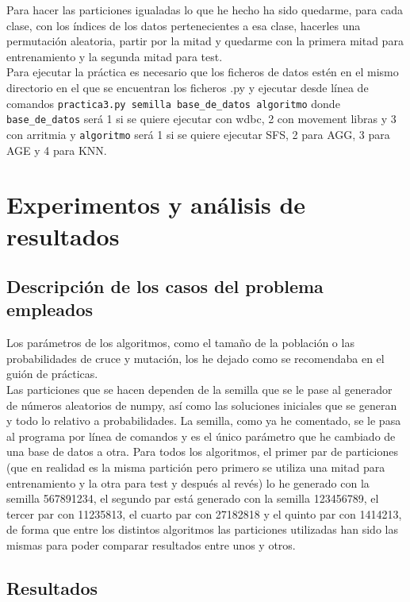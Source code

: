\documentclass[12pt]{article}
\begin{document}
Para hacer las particiones igualadas lo que he hecho ha sido quedarme, para cada clase, con los índices de los datos pertenecientes a esa clase, hacerles una permutación aleatoria, partir por la mitad y quedarme con la primera mitad para entrenamiento y la segunda mitad para test.\\

Para ejecutar la práctica es necesario que los ficheros de datos estén en el mismo directorio en el que se encuentran los ficheros .py y ejecutar desde línea de comandos \texttt{practica3.py semilla base\_de\_datos algoritmo} donde \texttt{base\_de\_datos} será 1 si se quiere ejecutar con wdbc, 2 con movement libras y 3 con arritmia y \texttt{algoritmo} será 1 si se quiere ejecutar SFS, 2 para AGG, 3 para AGE y 4 para KNN.

\newpage

\section{Experimentos y análisis de resultados}
\subsection{Descripción de los casos del problema empleados}

Los parámetros de los algoritmos, como el tamaño de la población o las probabilidades de cruce y mutación, los he dejado como se recomendaba en el guión de prácticas.\\
Las particiones que se hacen dependen de la semilla que se le pase al generador de números aleatorios de numpy, así como las soluciones iniciales que se generan y todo lo relativo a probabilidades. La semilla, como ya he comentado, se le pasa al programa por línea de comandos y es el único parámetro que he cambiado de una base de datos a otra. Para todos los algoritmos, el primer par de particiones (que en realidad es la misma partición pero primero se utiliza una mitad para entrenamiento y la otra para test y después al revés) lo he generado con la semilla 567891234, el segundo par está generado con la semilla 123456789, el tercer par con 11235813, el cuarto par con 27182818 y el quinto par con 1414213, de forma que entre los distintos algoritmos las particiones utilizadas han sido las mismas para poder comparar resultados entre unos y otros.

\subsection{Resultados}
\end{document}
